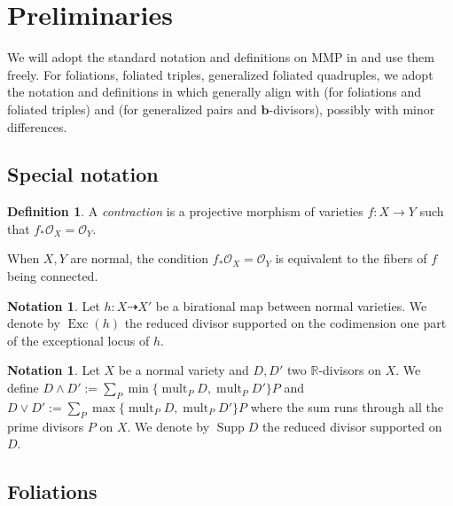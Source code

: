 \documentclass[12pt]{amsart}
\numberwithin{equation}{section}
\newcommand{\bb}{\bm{b}}
\newcommand{\Rr}{\mathbb{R}}
\newcommand{\Exc}{\operatorname{Exc}}
\newcommand{\Supp}{\operatorname{Supp}}
\newcommand{\mult}{\operatorname{mult}}
\theoremstyle{definition}
\newtheorem{defn}[thm]{Definition}
\theoremstyle{definition}
\newtheorem{nota}[thm]{Notation}
\theoremstyle{definition}
\begin{document}
\section{Preliminaries}\label{sec: prelimaries}


We will adopt the standard notation and definitions on MMP in \cite{KM98,BCHM10} and use them freely. For foliations, foliated triples, generalized foliated quadruples, we adopt the notation and definitions in \cite{LLM23,CHLX23} which generally align with \cite{CS20, ACSS21, CS21} (for foliations and foliated triples) and \cite{BZ16,HL23} (for generalized pairs and $\bb$-divisors), possibly with minor differences. 

\subsection{Special notation}

\begin{defn}
    A \emph{contraction} is a projective morphism of varieties
    $f \colon X \to Y$
    such that 
    $f_\ast \mathcal{O}_X=\mathcal{O}_Y$.
\end{defn}

When $X, Y$ are normal, the condition 
$f_\ast \mathcal{O}_X=\mathcal{O}_Y$
is equivalent to the fibers of $f$ being connected.

\begin{nota}
    Let $h \colon  X\dashrightarrow X'$ be a birational map between normal varieties. We denote by $\Exc(h)$ the reduced divisor supported on the codimension one part of the exceptional locus of $h$. 
\end{nota}

\begin{nota}
    Let $X$ be a normal variety and $D,D'$ two $\Rr$-divisors on $X$. We define 
    $D\wedge D':=\sum_P\min\{\mult_PD,\mult_PD'\}P$ and  $D\vee D':=\sum_P\max\{\mult_PD,\mult_PD'\}P$ where the sum runs through all the prime divisors $P$ on $X$. We denote by $\Supp D$ the reduced divisor supported on $D$. 
\end{nota}

\subsection{Foliations}
\end{document}
